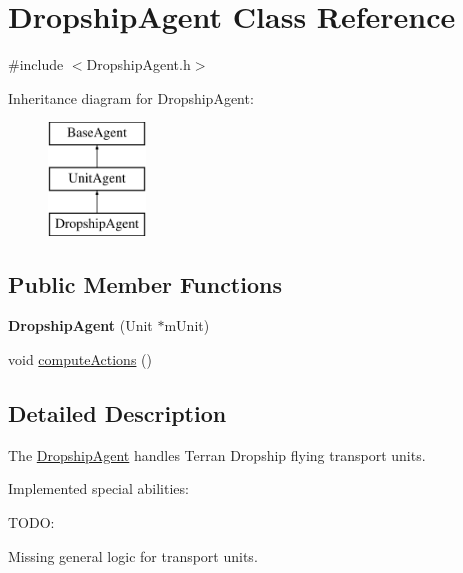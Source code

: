 \hypertarget{class_dropship_agent}{
\section{DropshipAgent Class Reference}
\label{class_dropship_agent}
}


{\ttfamily \#include $<$DropshipAgent.h$>$}

Inheritance diagram for DropshipAgent:\begin{figure}[H]
\begin{center}
\leavevmode
\includegraphics[height=3.000000cm]{class_dropship_agent}
\end{center}
\end{figure}
\subsection*{Public Member Functions}
\begin{DoxyCompactItemize}
\item 
\hypertarget{class_dropship_agent_ac92bf437f4c98961f0425860502d02fb}{
{\bfseries DropshipAgent} (Unit $\ast$mUnit)}
\label{class_dropship_agent_ac92bf437f4c98961f0425860502d02fb}

\item 
void \hyperlink{class_dropship_agent_aa0ae7d6593991a603a0639e33192d32b}{computeActions} ()
\end{DoxyCompactItemize}


\subsection{Detailed Description}
The \hyperlink{class_dropship_agent}{DropshipAgent} handles Terran Dropship flying transport units.

Implemented special abilities:
\begin{DoxyItemize}
\item 
\end{DoxyItemize}

TODO:
\begin{DoxyItemize}
\item Missing general logic for transport units.
\end{DoxyItemize}

